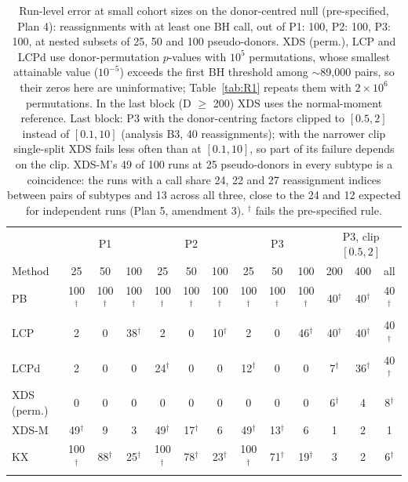 \begin{table}[h]\centering\small\setlength{\tabcolsep}{3pt}
\caption{Run-level error at small cohort sizes on the donor-centred null (pre-specified, Plan 4): reassignments with at least one BH call, out of P1: 100, P2: 100, P3: 100, at nested subsets of 25, 50 and 100 pseudo-donors. XDS (perm.), LCP and LCPd use donor-permutation $p$-values with $10^5$ permutations, whose smallest attainable value ($10^{-5}$) exceeds the first BH threshold among $\sim$89{,}000 pairs, so their zeros here are uninformative; Table~\ref{tab:R1} repeats them with $2\times10^6$ permutations. In the last block (D $\ge$ 200) XDS uses the normal-moment reference. Last block: P3 with the donor-centring factors clipped to $[0.5,2]$ instead of $[0.1,10]$ (analysis B3, 40 reassignments); with the narrower clip single-split XDS fails less often than at $[0.1,10]$, so part of its failure depends on the clip. XDS-M's 49 of 100 runs at 25 pseudo-donors in every subtype is a coincidence: the runs with a call share 24, 22 and 27 reassignment indices between pairs of subtypes and 13 across all three, close to the 24 and 12 expected for independent runs (Plan 5, amendment 3). $^\dagger$ fails the pre-specified rule.}\label{tab:smallD}
\begin{tabular}{lccccccccc|ccc}\toprule
 & \multicolumn{3}{c}{P1} & \multicolumn{3}{c}{P2} & \multicolumn{3}{c}{P3} & \multicolumn{3}{c}{P3, clip $[0.5,2]$}\\
Method & 25 & 50 & 100 & 25 & 50 & 100 & 25 & 50 & 100 & 200 & 400 & all\\\midrule
PB & 100$^\dagger$ & 100$^\dagger$ & 100$^\dagger$ & 100$^\dagger$ & 100$^\dagger$ & 100$^\dagger$ & 100$^\dagger$ & 100$^\dagger$ & 100$^\dagger$ & 40$^\dagger$ & 40$^\dagger$ & 40$^\dagger$\\
LCP & 2 & 0 & 38$^\dagger$ & 2 & 0 & 10$^\dagger$ & 2 & 0 & 46$^\dagger$ & 40$^\dagger$ & 40$^\dagger$ & 40$^\dagger$\\
LCPd & 2 & 0 & 0 & 24$^\dagger$ & 0 & 0 & 12$^\dagger$ & 0 & 0 & 7$^\dagger$ & 36$^\dagger$ & 40$^\dagger$\\
XDS (perm.) & 0 & 0 & 0 & 0 & 0 & 0 & 0 & 0 & 0 & 6$^\dagger$ & 4 & 8$^\dagger$\\
XDS-M & 49$^\dagger$ & 9 & 3 & 49$^\dagger$ & 17$^\dagger$ & 6 & 49$^\dagger$ & 13$^\dagger$ & 6 & 1 & 2 & 1\\
KX & 100$^\dagger$ & 88$^\dagger$ & 25$^\dagger$ & 100$^\dagger$ & 78$^\dagger$ & 23$^\dagger$ & 100$^\dagger$ & 71$^\dagger$ & 19$^\dagger$ & 3 & 2 & 6$^\dagger$\\
\bottomrule\end{tabular}\end{table}
